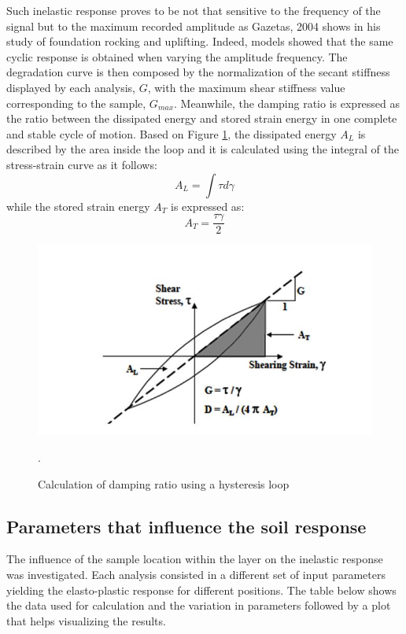 \documentclass[12pt,a4paper]{report}
\begin{document}
Such inelastic response proves to be not that sensitive to the frequency of the signal but to the maximum recorded amplitude as Gazetas, 2004 \cite{gazetas2004seismic} shows in his study of foundation rocking and uplifting. Indeed, models showed that the same cyclic response is obtained when varying the amplitude frequency. 
The degradation curve is then composed by the normalization of the secant stiffness displayed by each analysis, $G$, with the maximum shear stiffness value corresponding to the sample, $G_{max}$. Meanwhile, the damping ratio is expressed as the ratio between the dissipated energy and stored strain energy in one complete and stable cycle of motion. Based on Figure \ref{loop}, the dissipated energy $A_L$ is described by the area inside the loop and it is calculated using the integral of the stress-strain curve as it follows:
\begin{equation}
	A_L=\int\tau d\gamma
\end{equation}
while the stored strain energy $A_T$ is expressed as:
\begin{equation}
	A_T=\frac{\tau \gamma}{2}
\end{equation}

\begin{figure}[h!]
	\centering
	\includegraphics[width=0.4\linewidth]{"loop"}
	\caption{Calculation of damping ratio using a hysteresis loop}
	\label{loop}.
\end{figure}

\newpage
\subsection{Parameters that influence the soil response}
The influence of the sample location within the layer on the inelastic response was investigated. Each analysis consisted in a different set of input parameters yielding the elasto-plastic response for different positions. The table below shows the data used for calculation and the variation in parameters followed by a plot that helps visualizing the results. 
\end{document}
